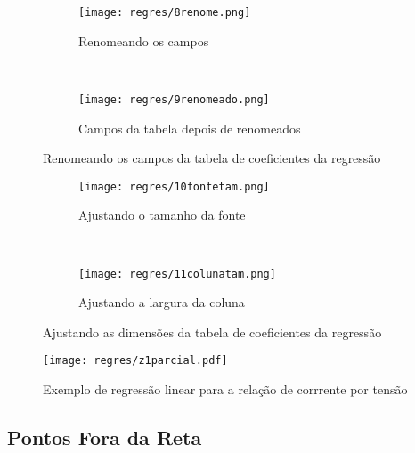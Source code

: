    \begin{figure}[htbp]
        \centering
        \begin{subfigure}{0.45\textwidth}
            \centering
            \texttt{[image: regres/8renome.png]}

            \caption{Renomeando os campos}
            \label{fig:regres:renome1}
        \end{subfigure}
        ~
        \begin{subfigure}{0.450\textwidth}
            \centering
            \texttt{[image: regres/9renomeado.png]}

            \caption{Campos da tabela depois de renomeados}
            \label{fig:regres:renome2}
        \end{subfigure}
        \caption{Renomeando os campos da tabela de coeficientes da regressão}
        \label{fig:regres:renome}
    \end{figure}

    \begin{figure}[htbp]
        \centering
        \begin{subfigure}{0.5\textwidth}
            \centering
            \texttt{[image: regres/10fontetam.png]}

            \caption{Ajustando o tamanho da fonte}
            \label{fig:regres:fontetam}
        \end{subfigure}
        ~
        \begin{subfigure}{0.40\textwidth}
            \centering
            \texttt{[image: regres/11colunatam.png]}

            \caption{Ajustando a largura da coluna}
            \label{fig:regres:colunatam}
        \end{subfigure}
        \caption{Ajustando as dimensões da tabela de coeficientes da regressão}
        \label{fig:regres:tamanhos}
    \end{figure}

    \begin{figure}[htbp]
        \centering
        \texttt{[image: regres/z1parcial.pdf]}

        \caption{Exemplo de regressão linear para a relação de corrrente por tensão}
        \label{fig:regres:semifinal}
    \end{figure}


\subsection{Pontos Fora da Reta}


